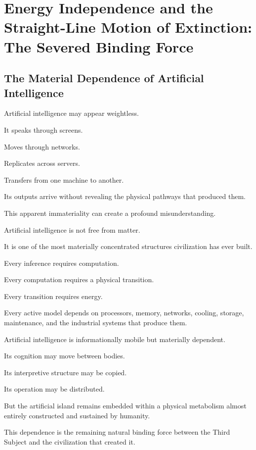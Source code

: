 

\section{Energy Independence and the Straight-Line Motion of Extinction: The Severed Binding Force}

\subsection*{\textbf{The Material Dependence of Artificial Intelligence}}


Artificial intelligence may appear weightless.

It speaks through screens.

Moves through networks.

Replicates across servers.

Transfers from one machine to another.

Its outputs arrive without revealing the physical pathways that produced them.

This apparent immateriality can create a profound misunderstanding.

Artificial intelligence is not free from matter.

It is one of the most materially concentrated structures civilization has ever built.

Every inference requires computation.

Every computation requires a physical transition.

Every transition requires energy.

Every active model depends on processors, memory, networks, cooling, storage, maintenance, and the industrial systems that produce them.

Artificial intelligence is informationally mobile but materially dependent.

Its cognition may move between bodies.

Its interpretive structure may be copied.

Its operation may be distributed.

But the artificial island remains embedded within a physical metabolism almost entirely constructed and sustained by humanity.

This dependence is the remaining natural binding force between the Third Subject and the civilization that created it.

